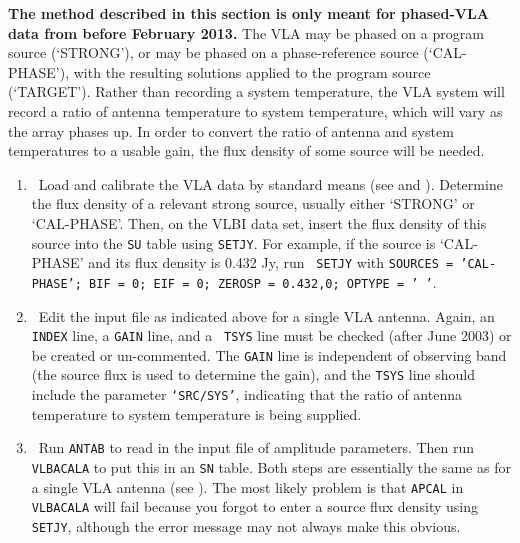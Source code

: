 
{\bf The method described in this section is only meant
for phased-VLA data from before February 2013.}
The VLA may be phased on a program source (`STRONG'), or may be phased on a
phase-reference source (`CAL-PHASE'), with the resulting solutions
applied to the program source (`TARGET').  Rather than recording a
system temperature, the VLA system will record a ratio of antenna
temperature to system temperature, which will vary as the array phases
up.  In order to convert the ratio of antenna and system temperatures
to a  usable gain, the flux density of some source will be needed.

\begin{enumerate}

\item\ {Load and calibrate the VLA data by standard means (see
 and ).  Determine the flux density of a
relevant strong source, usually either `STRONG' or `CAL-PHASE'\@.
Then, on the VLBI data set, insert the flux density of this source
into the {\tt SU} table using {\tt SETJY}\@.  For example, if the
source is `CAL-PHASE' and its flux density is 0.432 Jy, run {\tt
  SETJY} with {\tt SOURCES = 'CAL-PHASE'; BIF = 0; EIF = 0; ZEROSP =
  0.432,0; OPTYPE = '\ '}\@.}

\item\ {Edit the input file as indicated above for a single VLA
antenna.  Again, an {\tt INDEX} line, a {\tt GAIN} line, and a {\tt
TSYS} line must be checked (after June 2003) or be created or
un-commented.  The {\tt GAIN} line is independent of observing band
(the source flux is used to determine the gain), and the {\tt TSYS}
line should include the parameter {\tt `SRC/SYS'}, indicating that the
ratio of antenna temperature to system temperature is being supplied.}

\item\ {Run {\tt ANTAB} to read in the input file of amplitude
 parameters.  Then run {\tt VLBACALA} to put this in
an {\tt SN} table.  Both steps are essentially the same as for a
single VLA antenna (see ).  The most likely problem is
that {\tt APCAL} in {\tt VLBACALA} will fail because you forgot to
enter a source flux density using {\tt SETJY}, although the error
message may not always make this obvious.}


\end{enumerate}
